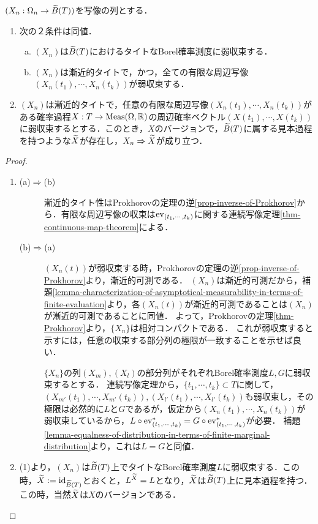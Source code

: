 \documentclass[uplatex,dvipdfmx]{jsreport}
\begin{document}
\begin{theorem}[タイトな確率過程に弱収束する条件の特徴付け１]\label{thm-characterization-of-weak-convergence-of-stochastic-process-1}
    $(X_n:\Omega_n\to\widetilde{B}(T))$を写像の列とする．
    \begin{enumerate}
        \item 次の２条件は同値．
        \begin{enumerate}[(a)]
            \item $(X_n)$は$\widetilde{B}(T)$におけるタイトなBorel確率測度に弱収束する．
            \item $(X_n)$は漸近的タイトで，かつ，全ての有限な周辺写像$(X_n(t_1),\cdots,X_n(t_k))$が弱収束する．
        \end{enumerate}
        \item $(X_n)$は漸近的タイトで，任意の有限な周辺写像$(X_n(t_1),\cdots,X_n(t_k))$がある確率過程$X:T\to\mathrm{Meas}(\Omega,\mathbb{R})$の周辺確率ベクトル$(X(t_1),\cdots,X(t_k))$に弱収束するとする．このとき，$X$のバージョンで，$\widetilde{B}(T)$に属する見本過程を持つような$\widetilde{X}$が存在し，$X_n\Rightarrow\widetilde{X}$が成り立つ．
    \end{enumerate}
\end{theorem}
\begin{proof}\mbox{}
    \begin{enumerate}
        \item \begin{description}
            \item[(a)$\Rightarrow$(b)] 漸近的タイト性はProkhorovの定理の逆\ref{prop-inverse-of-Prokhorov}から．有限な周辺写像の収束は$\mathrm{ev}_{(t_1,\cdots,t_k)}$に関する連続写像定理\ref{thm-continuous-map-theorem}による．
            \item[(b)$\Rightarrow$(a)]
            $(X_n(t))$が弱収束する時，Prokhorovの定理の逆\ref{prop-inverse-of-Prokhorov}より，漸近的可測である．
            $(X_n)$は漸近的可測だから，補題\ref{lemma-characterization-of-asymptotical-measurability-in-terms-of-finite-evaluation}より，各$(X_n(t))$が漸近的可測であることは$(X_n)$が漸近的可測であることに同値．
            よって，Prokhorovの定理\ref{thm-Prokhorov}より，$\{X_n\}$は相対コンパクトである．
            これが弱収束すると示すには，任意の収束する部分列の極限が一致することを示せば良い．

            $\{X_n\}$の列$(X_m),(X_l)$の部分列がそれぞれBorel確率測度$L,G$に弱収束するとする．
            連続写像定理から，$\{t_1,\cdots,t_k\}\subset T$に関して，$(X_{m'}(t_1),\cdots,X_{m'}(t_k)),(X_{l'}(t_1),\cdots,X_{l'}(t_k))$も弱収束し，その極限は必然的に$L$と$G$であるが，仮定から$(X_n(t_1),\cdots,X_n(t_k))$が弱収束しているから，$L\circ\mathrm{ev}_{(t_1,\cdots,t_k)}^*=G\circ\mathrm{ev}_{(t_1,\cdots,t_k)}^*$が必要．
            補題\ref{lemma-equalness-of-distribution-in-terms-of-finite-marginal-distribution}より，これは$L=G$と同値．
        \end{description}
        \item (1)より，$(X_n)$は$\widetilde{B}(T)$上でタイトなBorel確率測度$L$に弱収束する．この時，$\widetilde{X}:=\mathrm{id}_{\widetilde{B}(T)}$とおくと，$L^{\widetilde{X}}=L$となり，$\widetilde{X}$は$\widetilde{B}(T)$上に見本過程を持つ．
        この時，当然$\widetilde{X}$は$X$のバージョンである．
    \end{enumerate}
\end{proof}
\end{document}
